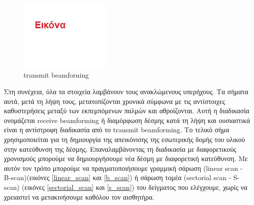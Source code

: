\documentclass[12pt,a4paper]{book}
\begin{document}
\begin{figure}
	\centering
	\includegraphics[width=0.4\textwidth]{myimage}
	\caption{transmit beamforning}
	\label{tx_bfm}
\end{figure}

Στη συνέχεια, όλα τα στοιχεία λαμβάνουν τους ανακλώμενους υπερήχους. Τα σήματα αυτά, μετά τη λήψη τους, μετατοπίζονται χρονικά σύμφωνα με τις αντίστοιχες καθυστερήσεις μεταξύ των εκπεμπόμενων παλμών και αθροίζονται. Αυτή η διαδικασία ονομάζεται receive beamforming ή διαμόρφωση δέσμης κατά τη λήψη και ουσιαστικά είναι η αντίστροφη διαδικασία από το transmit beamforming.  Το τελικό σήμα χρησιμοποιείται για τη δημιουργία της απεικόνισης της εσωτερικής δομής του υλικού στην κατεύθυνση της δέσμης. Επαναλαμβάνοντας τη διαδικασία με διαφορετικούς χρονισμούς μπορούμε να δημιουργήσουμε νέα δέσμη με διαφορετική κατεύθυνση. Με αυτόν τον τρόπο μπορούμε να πραγματοποιήσουμε γραμμική σάρωση (linear scan - B-scan)(εικόνες \ref{linear_scan} και \ref{b_scan}) ή σάρωση τομέα (sectorial scan - S-scan) (εικόνες \ref{sectorial_scan} και \ref{s_scan}) του δείγματος που ελέγχουμε, χωρίς να χρειαστεί να μετακινήσουμε καθόλου τον αισθητήρα.
\end{document}
